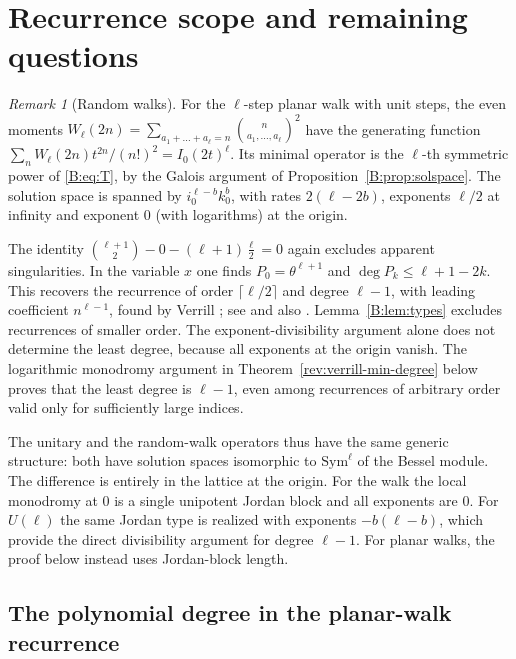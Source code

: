 \documentclass[11pt,a4paper]{article}
\theoremstyle{definition}
\theoremstyle{remark}
\newtheorem{remark}[theorem]{Remark}
\newcommand{\cl}[1]{\lceil #1\rceil}
\numberwithin{equation}{section}
\begin{document}
\clearpage

\section{Recurrence scope and remaining questions}\label{B:sec:remarks}

\begin{remark}[Random walks]\label{B:rem:walks}
For the $\ell$-step planar walk with unit steps, the even moments $W_\ell(2n)=\sum_{a_1+\dots+a_\ell=n}\binom{n}{a_1,\dots,a_\ell}^2$ have the generating function $\sum_nW_\ell(2n)t^{2n}/(n!)^2=I_0(2t)^\ell$. Its minimal operator is the $\ell$-th symmetric power of \eqref{B:eq:T}, by the Galois argument of Proposition~\ref{B:prop:solspace}. The solution space is spanned by $i_0^{\ell-b}k_0^b$, with rates $2(\ell-2b)$, exponents $\ell/2$ at infinity and exponent $0$ (with logarithms) at the origin.

The identity $\binom{\ell+1}2-0-(\ell+1)\frac{\ell}2=0$ again excludes apparent singularities. In the variable $x$ one finds $P_0=\theta^{\ell+1}$ and $\deg P_k\le\ell+1-2k$. This recovers the recurrence of order $\cl{\ell/2}$ and degree $\ell-1$, with leading coefficient $n^{\ell-1}$, found by Verrill \cite{Ver04}; see \cite[Thms.~1 and~2]{BNSW11} and also \cite{BSWZ12}. Lemma~\ref{B:lem:types} excludes recurrences of smaller order.
The exponent-divisibility argument alone does not determine the least
degree, because all exponents at the origin vanish. The logarithmic
monodromy argument in Theorem~\ref{rev:verrill-min-degree} below proves
that the least degree is $\ell-1$, even among recurrences of arbitrary
order valid only for sufficiently large indices.

The unitary and the random-walk operators thus have the same generic structure: both have solution spaces isomorphic to $\mathrm{Sym}^\ell$ of the Bessel module. The difference is entirely in the lattice at the origin. For the walk the local monodromy at $0$ is a single unipotent Jordan block and all exponents are $0$. For $U(\ell)$ the same Jordan type is realized with exponents
$-b(\ell-b)$, which provide the direct divisibility argument for
degree $\ell-1$. For planar walks, the proof below instead uses
Jordan-block length.
\end{remark}

\subsection{The polynomial degree in the planar-walk recurrence}
\label{rev:verrill-degree}
\end{document}
